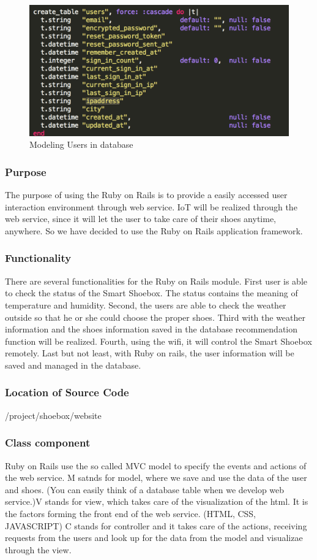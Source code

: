 \documentclass[conference]{IEEEtran}
\begin{document}
\begin{figure}[H]
\begin{center}
    \includegraphics[scale=0.48]{schemausers}
  \caption{Modeling Users in database}\label{fig:label}
\end{center}
\end{figure}
\subsubsection{Purpose} The purpose of using the Ruby on Rails is to provide a easily accessed user interaction environment through web service. IoT will be realized through the web service, since it will let the user to take care of their shoes anytime, anywhere. So we have decided to use the Ruby on Rails application framework.
\subsubsection{Functionality} There are several functionalities for the Ruby on Rails module. First user is able to check the status of the Smart Shoebox. The status contains the meaning of temperature and humidity. Second, the users are able to check the weather outside so that he or she could choose the proper shoes. Third with the weather information and the shoes information saved in the database recommendation function will be realized. Fourth, using the wifi, it will control the Smart Shoebox remotely. Last but not least, with Ruby on rails, the user information will be saved and managed in the database.
\subsubsection{Location of Source Code}/project/shoebox/website
\subsubsection{Class component} Ruby on Rails use the so called MVC model to specify the events and actions of the web service. M satnds for model, where we save and use the data of the user and shoes. (You can easily think of a database table when we develop web service.)V stands for view, which takes care of the visualization of the html. It is the factors forming the front end of the web service. (HTML, CSS, JAVASCRIPT) C stands for controller and it takes care of the actions, receiving requests from the users and look up for the data from the model and visualizae through the view.
\end{document}

